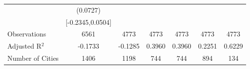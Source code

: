 \documentclass{article}
\begin{document}
\begin{table}[htbp]
\begin{tabular}{l*{6}{c}}
                    &    (0.0727)   &               &               &               &               &               \\
                    &[-0.2345,0.0504]   &               &               &               &               &               \\
\midrule
Observations        &        6561   &        4773   &        4773   &        4773   &        4773   &        4773   \\
Adjusted R$^2$      &     -0.1733   &     -0.1285   &      0.3960   &      0.3960   &      0.2251   &      0.6229   \\
Number of Cities    &        1406   &        1198   &         744   &         744   &         894   &         134   \\
\bottomrule
\end{tabular}
\end{table}
\end{document}
